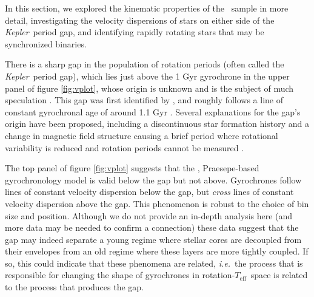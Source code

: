 \documentclass{aastex63}
\newcommand{\ie}{{\it i.e.}}
\newcommand{\kepler}{{\it Kepler}}
\newcommand{\teff}{$T_{\mathrm{eff}}$}
\newcommand{\mct}{\citet{mcquillan2014}}
\newcommand{\racomment}[1]{{\color{black}#1}}
\begin{document}
In this section, we explored the kinematic properties of the \mct\ sample in
more detail, investigating the velocity dispersions of stars on either side of
the \kepler\ period gap, and identifying rapidly rotating stars that may be
synchronized binaries.

There is a sharp gap in the population of rotation periods (often called the
\kepler\ period gap), which lies just above the 1 Gyr gyrochrone in the upper
panel of figure \ref{fig:vplot}, whose origin is unknown and is the subject of
much speculation \citep{mcquillan2014, davenport2017, davenport2018,
reinhold2019, reinhold2020}.
This gap was first identified by \mct, and roughly follows a line of constant
gyrochronal age of around 1.1 Gyr \citep[according to the][gyrochronology
relation]{angus2019}.
Several explanations for the gap's origin have been proposed, including a
discontinuous star formation history \citep{mcquillan2013, davenport2017,
davenport2018} and a change in magnetic field structure causing a brief period
where rotational variability is reduced and rotation periods cannot be
measured \citep{reinhold2019, reinhold2020}.

The top panel of figure \ref{fig:vplot} suggests that the \citet{angus2019},
Praesepe-based gyrochronology model is valid below the gap but not above.
Gyrochrones follow lines of constant velocity dispersion below the gap, but
{\it cross} lines of constant velocity dispersion above the gap.
This phenomenon is robust to the choice of bin size and position.
Although we do not provide an in-depth analysis here (and more data may be
needed to confirm a connection) these data suggest that the gap may indeed
separate a young regime where stellar cores are decoupled from their envelopes
from an old regime where these layers are more tightly coupled.
If so, this could indicate that
\racomment{these phenomena are related, \ie\
the process that is responsible for changing the shape of gyrochrones in
rotation-\teff\ space is related to the process that produces the gap.}
\end{document}
